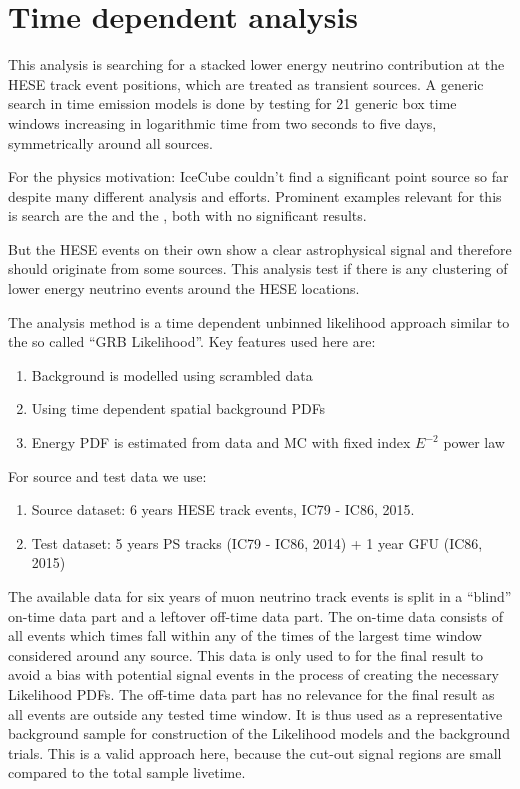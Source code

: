 \chapter{Time dependent analysis}

This analysis is searching for a stacked lower energy neutrino contribution at the HESE track event positions, which are treated as transient sources.
A generic search in time emission models is done by testing for 21 generic box time windows increasing in logarithmic time from two seconds to five days, symmetrically around all sources.

For the physics motivation: IceCube couldn’t find a significant point source so far despite many different analysis and efforts. Prominent examples relevant for this is search are the and the , both with no significant results.

But the HESE events on their own show a clear astrophysical signal and therefore should originate from some sources. This analysis test if there is any clustering of lower energy neutrino events around the HESE locations.

The analysis method is a time dependent unbinned likelihood approach similar to the so called “GRB Likelihood”. Key features used here are:
\begin{enumerate}
  \item Background is modelled using scrambled data
  \item Using time dependent spatial background PDFs
  \item Energy PDF is estimated from data and MC with fixed index $E^{-2}$ power law
\end{enumerate}
For source and test data we use:
\begin{enumerate}
  \item Source dataset: 6 years HESE track events, IC79 - IC86, 2015.
  \item Test dataset: 5 years PS tracks (IC79 - IC86, 2014) + 1 year GFU (IC86, 2015)
\end{enumerate}

The available data for six years of muon neutrino track events is split in a \enquote{blind} on-time data part and a leftover off-time data part.
The on-time data consists of all events which times fall within any of the times of the largest time window considered around any source.
This data is only used to for the final result to avoid a bias with potential signal events in the process of creating the necessary Likelihood PDFs.
The off-time data part has no relevance for the final result as all events are outside any tested time window.
It is thus used as a representative background sample for construction of the Likelihood models and the background trials.
This is a valid approach here, because the cut-out signal regions are small compared to the total sample livetime.

